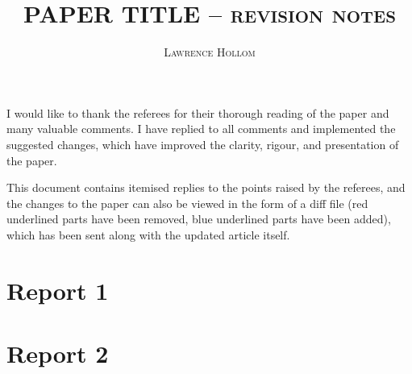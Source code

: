 \documentclass[reqno,a4paper,11pt]{article}
\begin{document}
\title{\textsc{\bfseries PAPER TITLE -- revision notes}}

\renewcommand{\thefootnote}{\fnsymbol{footnote}}

\author{\textsc{Lawrence Hollom}\footnotemark[1]}


\renewcommand{\thefootnote}{\arabic{footnote}}

\maketitle

\date{}


I would like to thank the referees for their thorough reading of the paper and many valuable comments.
I have replied to all comments and implemented the suggested changes, which have improved the clarity, rigour, and presentation of the paper.

This document contains itemised replies to the points raised by the referees, and the changes to the paper can also be viewed in the form of a diff file (red underlined parts have been removed, blue underlined parts have been added), which has been sent along with the updated article itself.


\section*{Report 1}


\section*{Report 2}
\end{document}
